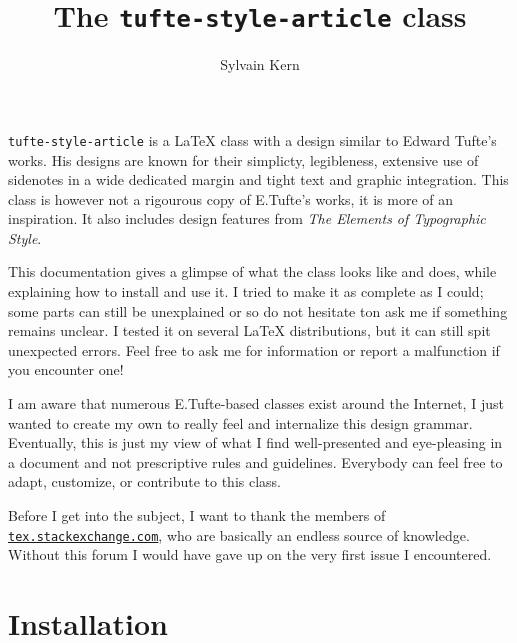 \documentclass[raggedright, twoside, 11pt]{tufte-style-article}
\title{The \texttt{tufte-style-article} class}
\author{Sylvain Kern}
\begin{document}
	
\maketitle	

\noindent
\texttt{tufte-style-article} is a \LaTeX{} class with a design similar to Edward Tufte's works. His designs are known for their simplicty, legibleness, extensive use of sidenotes in a wide dedicated margin and tight text and graphic integration. This class is however not a rigourous copy of E.Tufte's works, it is more of an inspiration. It also includes design features from \textit{The Elements of Typographic Style}.

This documentation gives a glimpse of what the class looks like and does, while explaining how to install and use it. I tried to make it as complete as I could; some parts can still be unexplained or so do not hesitate ton ask me if something remains unclear. I tested it on several \LaTeX{} distributions, but it can still spit unexpected errors. Feel free to ask me for information or report a malfunction if you encounter one!

I am aware that numerous E.Tufte-based classes exist around the Internet, I just wanted to create my own to really feel and internalize this design grammar. Eventually, this is just my view of what I find well-presented and eye-pleasing in a document and not prescriptive rules and guidelines. Everybody can feel free to adapt, customize, or contribute to this class.

Before I get into the subject, I want to thank the members of\\\noindent \href{www.tex.stackexchange.com}{\texttt{tex.stackexchange.com}}, who are basically an endless source of knowledge. Without this forum I would have gave up on the very first issue I encountered. 


\tableofcontents


\section{Installation}
\end{document}
